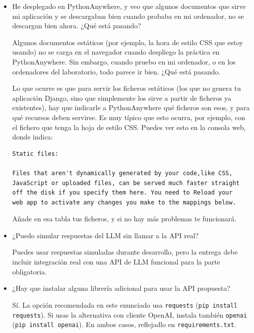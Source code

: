 \begin{itemize}
\item He desplegado en PythonAnywhere, y veo que algunos documentos que sirve mi aplicación y se descargaban bien cuando probaba en mi ordenador, no se descargan bien ahora. ¿Qué está pasando?

  Algunos documentos estáticos (por ejemplo, la hora de estilo CSS que estoy usando) no se carga en el navegador cuando despliego la práctica en PythonAnywhere. Sin embargo, cuando pruebo en mi ordenador, o en los ordenadores del laboratorio, todo parece ir bien. ¿Qué está pasando.

  Lo que ocurre es que para servir los ficheros estáticos (los que no genera tu aplicación Django, sino que simplemente los sirve a partir de ficheros ya existentes), hay que indicarle a PythonAnywhere qué ficheros son esos, y para qué recursos deben servirse. Es muy típico que esto ocurra, por ejemplo, con el fichero que tenga la hoja de estilo CSS. Puedes ver esto en la consola web, donde indica:

  \begin{verbatim}
Static files:

Files that aren't dynamically generated by your code,like CSS,
JavaScript or uploaded files, can be served much faster straight
off the disk if you specify them here. You need to Reload your
web app to activate any changes you make to the mappings below.
\end{verbatim}

  Añade en esa tabla tus ficheros, y si no hay más problemas te funcionará.

\item ¿Puedo simular respuestas del LLM sin llamar a la API real?

  Puedes usar respuestas simuladas durante desarrollo, pero la entrega debe incluir integración real con una API de LLM funcional para la parte obligatoria.

\item ¿Hay que instalar alguna librería adicional para usar la API propuesta?

  Sí. La opción recomendada en este enunciado usa \verb|requests| (\verb|pip install requests|). Si usas la alternativa con cliente OpenAI, instala también \verb|openai| (\verb|pip install openai|). En ambos casos, reflejadlo en \verb|requirements.txt|.
\end{itemize}

